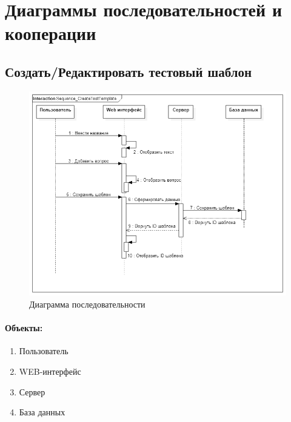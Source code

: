 \documentclass{article}
\begin{document}
    \section{Диаграммы последовательностей и кооперации}
    

    \subsection{Создать/Редактировать тестовый шаблон}   
        \begin{figure}[H]
            \includegraphics[width=\textwidth, center]{Sequence_CreateTestTemplate}
            \caption{Диаграмма последовательности}
        \end{figure}
        
        \paragraph{Объекты:}
        \begin{enumerate}
            \item Пользователь
            \item WEB-интерфейс
            \item Сервер
            \item База данных
        \end{enumerate}
        
\end{document}
